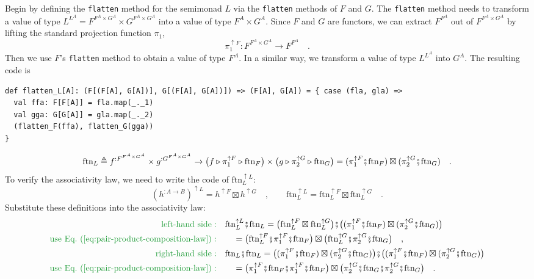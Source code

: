 Begin by defining the \lstinline!flatten! method for the semimonad
$L$ via the \lstinline!flatten! methods of $F$ and $G$. The \lstinline!flatten!
method needs to transform a value of type $L^{L^{A}}=F^{F^{A}\times G^{A}}\times G^{F^{A}\times G^{A}}$
into a value of type $F^{A}\times G^{A}$. Since $F$ and $G$ are
functors, we can extract $F^{F^{A}}$ out of $F^{F^{A}\times G^{A}}$
by lifting the standard projection function $\pi_{1}$,
\[
\pi_{1}^{\uparrow F}:F^{F^{A}\times G^{A}}\rightarrow F^{F^{A}}\quad.
\]
Then we use $F$\textsf{'}s \lstinline!flatten! method to obtain a value of
type $F^{A}$. In a similar way, we transform a value of type $L^{L^{A}}$
into $G^{A}$. The resulting code is
\begin{lstlisting}
def flatten_L[A]: (F[(F[A], G[A])], G[(F[A], G[A])]) => (F[A], G[A]) = { case (fla, gla) =>
  val ffa: F[F[A]] = fla.map(_._1)
  val gga: G[G[A]] = gla.map(_._2)
  (flatten_F(ffa), flatten_G(gga))
}
\end{lstlisting}
\[
\text{ftn}_{L}\triangleq f^{:F^{F^{A}\times G^{A}}}\times g^{:G^{F^{A}\times G^{A}}}\rightarrow\big(f\triangleright\pi_{1}^{\uparrow F}\triangleright\text{ftn}_{F}\big)\times\big(g\triangleright\pi_{2}^{\uparrow G}\triangleright\text{ftn}_{G}\big)=(\pi_{1}^{\uparrow F}\bef\text{ftn}_{F})\boxtimes(\pi_{2}^{\uparrow G}\bef\text{ftn}_{G})\quad.
\]
To verify the associativity law, we need to write the code of $\text{ftn}_{L}^{\uparrow L}$:
\[
(h^{:A\rightarrow B})^{\uparrow L}=h^{\uparrow F}\boxtimes h^{\uparrow G}\quad,\quad\quad\text{ftn}_{L}^{\uparrow L}=\text{ftn}_{L}^{\uparrow F}\boxtimes\text{ftn}_{L}^{\uparrow G}\quad.
\]
Substitute these definitions into the associativity law:
\begin{align*}
{\color{greenunder}\text{left-hand side}:}\quad & \text{ftn}_{L}^{\uparrow L}\bef\text{ftn}_{L}=\big(\text{ftn}_{L}^{\uparrow F}\boxtimes\text{ftn}_{L}^{\uparrow G}\big)\bef\big((\pi_{1}^{\uparrow F}\bef\text{ftn}_{F})\boxtimes(\pi_{2}^{\uparrow G}\bef\text{ftn}_{G})\big)\\
{\color{greenunder}\text{use Eq.~(\ref{eq:pair-product-composition-law})}:}\quad & \quad=\big(\text{ftn}_{L}^{\uparrow F}\bef\pi_{1}^{\uparrow F}\bef\text{ftn}_{F}\big)\boxtimes\big(\text{ftn}_{L}^{\uparrow G}\bef\pi_{2}^{\uparrow G}\bef\text{ftn}_{G}\big)\quad,\\
{\color{greenunder}\text{right-hand side}:}\quad & \text{ftn}_{L}\bef\text{ftn}_{L}=\big((\pi_{1}^{\uparrow F}\bef\text{ftn}_{F})\boxtimes(\pi_{2}^{\uparrow G}\bef\text{ftn}_{G})\big)\bef\big((\pi_{1}^{\uparrow F}\bef\text{ftn}_{F})\boxtimes(\pi_{2}^{\uparrow G}\bef\text{ftn}_{G})\big)\\
{\color{greenunder}\text{use Eq.~(\ref{eq:pair-product-composition-law})}:}\quad & \quad=\big(\pi_{1}^{\uparrow F}\bef\text{ftn}_{F}\bef\pi_{1}^{\uparrow F}\bef\text{ftn}_{F}\big)\boxtimes\big(\pi_{2}^{\uparrow G}\bef\text{ftn}_{G}\bef\pi_{2}^{\uparrow G}\bef\text{ftn}_{G}\big)\quad.
\end{align*}
